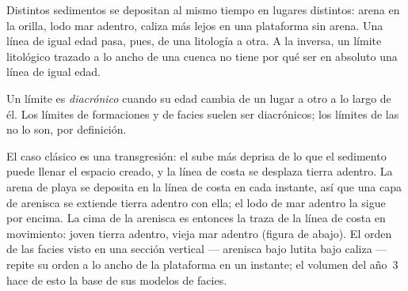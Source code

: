 Distintos sedimentos se depositan al mismo tiempo en lugares distintos: arena en la orilla, lodo mar adentro, caliza más lejos en una plataforma sin arena. Una línea de igual edad pasa, pues, de una litología a otra. A la inversa, un límite litológico trazado a lo ancho de una cuenca no tiene por qué ser en absoluto una línea de igual edad.

\begin{definition}\label{def:b1:stratigraphic-scale:diachronous}
Un límite es \emph{diacrónico} cuando su edad cambia de un lugar a otro a lo largo de él. Los límites de formaciones y de facies suelen ser diacrónicos; los límites de las  no lo son, por definición.
\end{definition}

El caso clásico es una transgresión: el  sube más deprisa de lo que el sedimento puede llenar el espacio creado, y la línea de costa se desplaza tierra adentro. La arena de playa se deposita en la línea de costa en cada instante, así que una capa de arenisca se extiende tierra adentro con ella; el lodo de mar adentro la sigue por encima. La cima de la arenisca es entonces la traza de la línea de costa en movimiento: joven tierra adentro, vieja mar adentro (figura de abajo). El orden de las facies visto en una sección vertical --- arenisca bajo lutita bajo caliza --- repite su orden a lo ancho de la plataforma en un instante; el volumen del año~3 hace de esto la base de sus modelos de facies.

